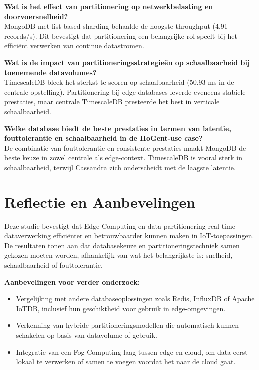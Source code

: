 \textbf{Wat is het effect van partitionering op netwerkbelasting en doorvoersnelheid?} \\  
MongoDB met list-based sharding behaalde de hoogste throughput (4.91 records/s). Dit bevestigt dat partitionering een belangrijke rol speelt bij het efficiënt verwerken van continue datastromen.

\textbf{Wat is de impact van partitioneringsstrategieën op schaalbaarheid bij toenemende datavolumes?} \\  
TimescaleDB bleek het sterkst te scoren op schaalbaarheid (50.93 ms in de centrale opstelling). Partitionering bij edge-databases leverde eveneens stabiele prestaties, maar centrale TimescaleDB presteerde het best in verticale schaalbaarheid.

\textbf{Welke database biedt de beste prestaties in termen van latentie, fouttolerantie en schaalbaarheid in de HoGent-use case?} \\  
De combinatie van fouttolerantie en consistente prestaties maakt MongoDB de beste keuze in zowel centrale als edge-context. TimescaleDB is vooral sterk in schaalbaarheid, terwijl Cassandra zich onderscheidt met de laagste latentie.

\section{Reflectie en Aanbevelingen}

Deze studie bevestigt dat Edge Computing en data-partitionering real-time dataverwerking efficiënter en betrouwbaarder kunnen maken in IoT-toepassingen. De resultaten tonen aan dat databasekeuze en partitioneringstechniek samen gekozen moeten worden, afhankelijk van wat het belangrijkste is: snelheid, schaalbaarheid of fouttolerantie.

\textbf{Aanbevelingen voor verder onderzoek:}
\begin{itemize}
    \item Vergelijking met andere databaseoplossingen zoals Redis, InfluxDB of Apache IoTDB, inclusief hun geschiktheid voor gebruik in edge-omgevingen.
    \item Verkenning van hybride partitioneringsmodellen die automatisch kunnen schakelen op basis van datavolume of gebruik.
    \item Integratie van een Fog Computing-laag tussen edge en cloud, om data eerst lokaal te verwerken of samen te voegen voordat het naar de cloud gaat.
\end{itemize}